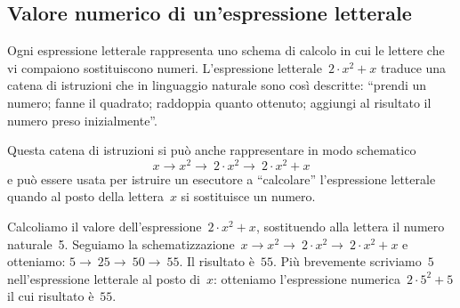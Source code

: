 \begin{comment}

\subsection{Lettere per esprimere proprietà}

Le proprietà delle operazioni tra numeri si esprimono con lettere per 
indicare che valgono per numeri qualsiasi.
La scrittura~``\((a+b)+c=a+(b+c)\)'' per esempio esprime la proprietà 
associativa dell'addizione. In essa le lettere~\(a\), \(b\), \(c\) indicano
numeri qualsiasi. I due schemi di calcolo ci dicono che per sommare tre 
numeri è indifferente aggiungere alla somma dei primi due il terzo oppure 
aggiungere al primo la somma degli altri due.


\end{comment}

\subsection{Valore numerico di un'espressione letterale}
\label{subsec:valnum}

Ogni espressione letterale rappresenta uno schema di calcolo in cui le 
lettere che vi compaiono sostituiscono numeri.
L'espressione letterale~\(2\cdot x^{2}+x\) traduce una catena di istruzioni 
che in linguaggio naturale sono così descritte: ``prendi un numero; 
fanne il quadrato; raddoppia quanto ottenuto; aggiungi al risultato 
il numero preso inizialmente''.

Questa catena di istruzioni si può anche rappresentare in modo schematico
\[x\rightarrow x^{2}\rightarrow~2\cdot x^{2}\rightarrow~2\cdot x^{2}+x\]
e può essere usata per istruire un esecutore a ``calcolare'' l'espressione 
letterale quando al posto della lettera~\(x\) si sostituisce un numero.

Calcoliamo il valore dell'espressione~\(2\cdot x^{2}+x\), sostituendo alla 
lettera il numero naturale~5.
Seguiamo la schematizzazione~\(x\rightarrow x^{2}\rightarrow~2\cdot 
x^{2}\rightarrow~2\cdot x^{2}+x\) e otteniamo:
\(5\rightarrow~25\rightarrow~50\rightarrow~55\).
Il risultato è~\(55\).
Più brevemente scriviamo~\(5\) nell'espressione letterale al posto di~\(x\): 
otteniamo l'espressione numerica~\(2\cdot 5^{2}+5\) il cui risultato è~\(55\).

